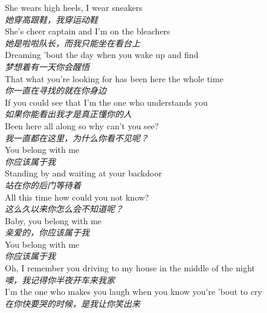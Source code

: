\begin{spacing}{1.5}
\begin{flushleft}
She wears high heels, I wear sneakers\\
\textit{她穿高跟鞋，我穿运动鞋}\\[0.5em]

She's cheer captain and I'm on the bleachers\\
\textit{她是啦啦队长，而我只能坐在看台上}\\[0.5em]

Dreaming 'bout the day when you wake up and find\\
\textit{梦想着有一天你会醒悟}\\[0.5em]

That what you're looking for has been here the whole time\\
\textit{你一直在寻找的就在你身边}\\[0.5em]

If you could see that I'm the one who understands you\\
\textit{如果你能看出我才是真正懂你的人}\\[0.5em]

Been here all along so why can't you see?\\
\textit{我一直都在这里，为什么你看不见呢？}\\[0.5em]

You belong with me\\
\textit{你应该属于我}\\[0.5em]

Standing by and waiting at your backdoor\\
\textit{站在你的后门等待着}\\[0.5em]

All this time how could you not know?\\
\textit{这么久以来你怎么会不知道呢？}\\[0.5em]

Baby, you belong with me\\
\textit{亲爱的，你应该属于我}\\[0.5em]

You belong with me\\
\textit{你应该属于我}\\[0.5em]

Oh, I remember you driving to my house in the middle of the night\\
\textit{噢，我记得你半夜开车来我家}\\[0.5em]

I'm the one who makes you laugh when you know you're 'bout to cry\\
\textit{在你快要哭的时候，是我让你笑出来}\\[0.5em]


\end{flushleft}
\end{spacing}

